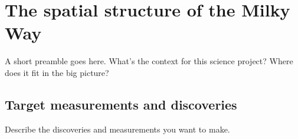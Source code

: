 %
%
%
%
%
%
%

\section{The spatial structure of the Milky Way}
\def\secname{MW_spatial_structure}\label{sec:\secname} %



A short preamble goes here. What's the context for this science
project? Where does it fit in the big picture?


\subsection{Target measurements and discoveries}
\label{sec:\secname:targets}

Describe the discoveries and measurements you want to make.

